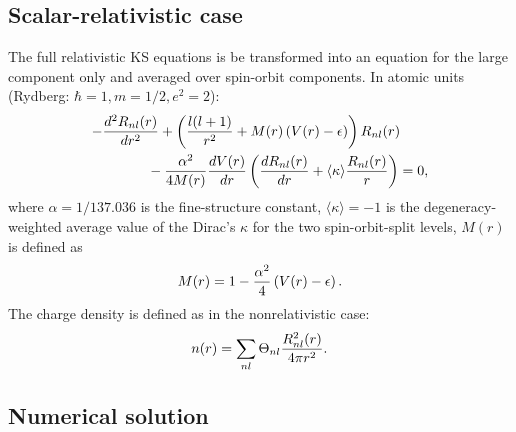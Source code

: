 \documentclass[12pt]{article}
\begin{document}
\subsection{Scalar-relativistic case} 

The full relativistic KS equations
is be transformed into an equation for the large component only
and averaged over spin-orbit components. In atomic units
(Rydberg: $\hbar=1, m=1/2, e^2=2$):
\begin{eqnarray}
-{d^2 R_{nl}(r)\over dr^2}
+\left( {l(l+1)\over r^2} + M(r)\left(V(r)-\epsilon\right)
\right) R_{nl}(r) \qquad \nonumber \\ \mbox{} -
 {\alpha^2\over 4M(r)} {dV(r)\over dr} 
                    \left({dR_{nl}(r)\over dr} +
                          \langle\kappa\rangle {R_{nl}(r)\over r}\right)= 0,
\end{eqnarray}
where $\alpha=1/137.036$ is the fine-structure constant,
$\langle\kappa\rangle=-1$ is the degeneracy-weighted average value 
of the Dirac's $\kappa$ for the two spin-orbit-split levels, $M(r)$ is
defined as
\begin{equation}
M(r)= 1 - {\alpha^2\over 4} \left(V(r)-\epsilon\right).
\end{equation}
The charge density is defined as in the nonrelativistic case:
\begin{equation}
n(r) = \sum_{nl} \Theta_{nl}{R^2_{nl}(r)\over 4\pi r^2}.
\end{equation}

\subsection{Numerical solution} 
\end{document}
